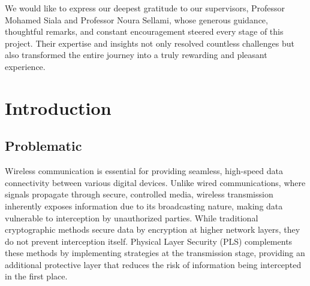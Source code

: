 \documentclass[10pt,a4paper]{article} %
\begin{document}
\begin{Large} %
\begin{doublespacing} %
We would like to express our deepest gratitude to our supervisors, Professor Mohamed Siala and Professor Noura Sellami, whose generous guidance, thoughtful remarks, and constant encouragement steered every stage of this project. Their expertise and insights not only resolved countless challenges but also transformed the entire journey into a truly rewarding and pleasant experience.


\end{doublespacing}
\end{Large}

\vfill %

\restoregeometry %
\cleardoublepage %
\fancyhf{} %
\rhead{\thepage} %
\tableofcontents

\cleardoublepage %

\setcounter{page}{1} %
\fancyhf{} %
\rhead{\thepage} %

\singlespacing 

\section{Introduction} %

\subsection{Problematic}
Wireless communication is essential for providing seamless, high-speed data connectivity between various digital devices. Unlike wired communications, where signals propagate through secure, controlled media, wireless transmission inherently exposes information due to its broadcasting nature, making data vulnerable to interception by unauthorized parties. While traditional cryptographic methods secure data by encryption at higher network layers, they do not prevent interception itself. Physical Layer Security (PLS) complements these methods by implementing strategies at the transmission stage, providing an additional protective layer that reduces the risk of information being intercepted in the first place.
\end{document}
